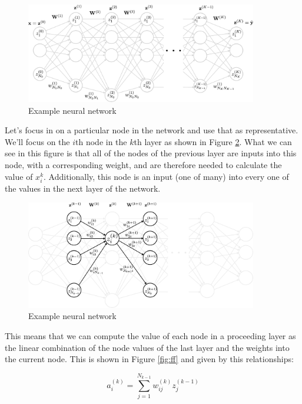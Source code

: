 \documentclass{article}
\begin{document}
\begin{figure}[h]
\centering
\includegraphics[width=0.9\textwidth]{./neural_networks_full_with_labels.eps}
\caption{Example neural network}
\label{fig:fullnn}
\end{figure}

Let's focus in on a particular node in the network and use that as representative. We'll focus on the $i$th node in the $k$th layer as shown in Figure \ref{fig:focused}. What we can see in this figure is that all of the nodes of the previous layer are inputs into this node, with a corresponding weight, and are therefore needed to calculate the value of $x_i^{k}$. Additionally, this node is an input (one of many) into every one of the values in the next layer of the network.

\begin{figure}[h]
\centering
\includegraphics[width=0.9\textwidth]{./neural_networks_full_focused_example.eps}
\caption{Example neural network}
\label{fig:focused}
\end{figure}

This means that we can compute the value of each node in a proceeding layer as the linear combination of the node values of the last layer and the weights into the current node. This is shown in Figure \ref{fig:ff} and given by this relationships: 

\begin{equation}
    a_i^{(k)} = \sum_{j=1}^{N_{k-1}} w_{ij}^{(k)} z_j^{(k-1)} 
\end{equation}
\end{document}
